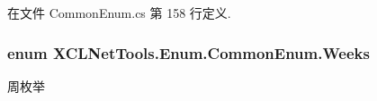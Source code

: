 在文件 Common\+Enum.\+cs 第 158 行定义.

\subsubsection[{\texorpdfstring{Weeks}{Weeks}}]{\setlength{\rightskip}{0pt plus 5cm}enum {\bf X\+C\+L\+Net\+Tools.\+Enum.\+Common\+Enum.\+Weeks}\hspace{0.3cm}{\ttfamily [strong]}}\hypertarget{class_x_c_l_net_tools_1_1_enum_1_1_common_enum_adeccaeb33560c30593da561d8d0fe8de}{}\label{class_x_c_l_net_tools_1_1_enum_1_1_common_enum_adeccaeb33560c30593da561d8d0fe8de}


周枚举 

